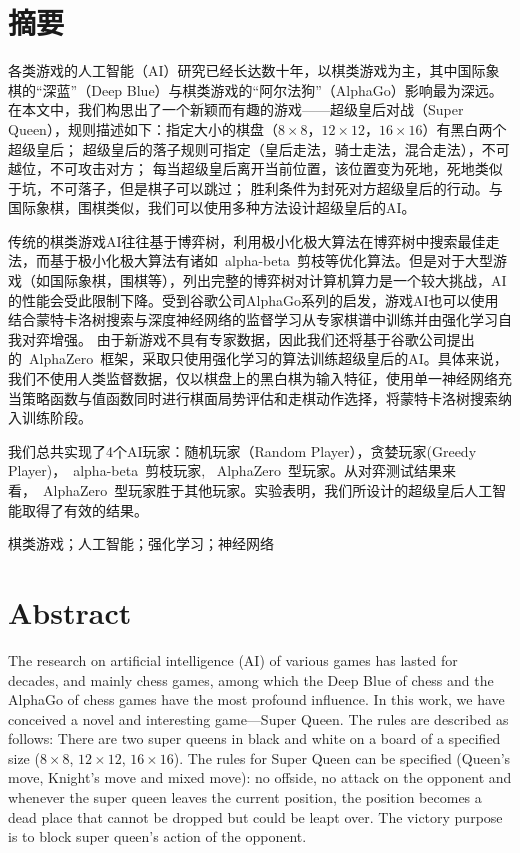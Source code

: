 \chapter*{摘要}

各类游戏的人工智能（AI）研究已经长达数十年，以棋类游戏为主，其中国际象棋的“深蓝”（Deep Blue）与棋类游戏的“阿尔法狗”（AlphaGo）影响最为深远。
在本文中，我们构思出了一个新颖而有趣的游戏——超级皇后对战（Super Queen），规则描述如下：指定大小的棋盘（$8\times8$，$12\times12$，$16\times16$）有黑白两个超级皇后；
超级皇后的落子规则可指定（皇后走法，骑士走法，混合走法），不可越位，不可攻击对方；
每当超级皇后离开当前位置，该位置变为死地，死地类似于坑，不可落子，但是棋子可以跳过；
胜利条件为封死对方超级皇后的行动。与国际象棋，围棋类似，我们可以使用多种方法设计超级皇后的AI。


传统的棋类游戏AI往往基于博弈树，利用极小化极大算法在博弈树中搜索最佳走法，而基于极小化极大算法有诸如~alpha-beta~剪枝等优化算法。但是对于大型游戏（如国际象棋，围棋等），列出完整的博弈树对计算机算力是一个较大挑战，AI的性能会受此限制下降。受到谷歌公司AlphaGo系列的启发，游戏AI也可以使用结合蒙特卡洛树搜索与深度神经网络的监督学习从专家棋谱中训练并由强化学习自我对弈增强。
由于新游戏不具有专家数据，因此我们还将基于谷歌公司提出的~AlphaZero~框架，采取只使用强化学习的算法训练超级皇后的AI。具体来说，我们不使用人类监督数据，仅以棋盘上的黑白棋为输入特征，使用单一神经网络充当策略函数与值函数同时进行棋面局势评估和走棋动作选择，将蒙特卡洛树搜索纳入训练阶段。


我们总共实现了4个AI玩家：随机玩家（Random Player），贪婪玩家(Greedy Player)，~alpha-beta~剪枝玩家, ~AlphaZero~型玩家。从对弈测试结果来看，~AlphaZero~型玩家胜于其他玩家。实验表明，我们所设计的超级皇后人工智能取得了有效的结果。

\medskip
{} 棋类游戏；人工智能；强化学习；神经网络

\chapter*{Abstract}

The research on artificial intelligence (AI) of various games has lasted for decades, and mainly chess games, among which the Deep Blue of chess and the AlphaGo of chess games have the most profound influence.
In this work, we have conceived a novel and interesting game---Super Queen. The rules are described as follows: There are two super queens in black and white on a board of a specified size ($8\times8$, $12\times12$, $16\times16$). 
The rules for Super Queen can be specified (Queen's move, Knight's move and mixed move): no offside, no attack on the opponent and whenever the super queen leaves the current position, the position becomes a dead place that cannot be dropped but could be leapt over. The victory purpose is to block super queen's action of the opponent.


